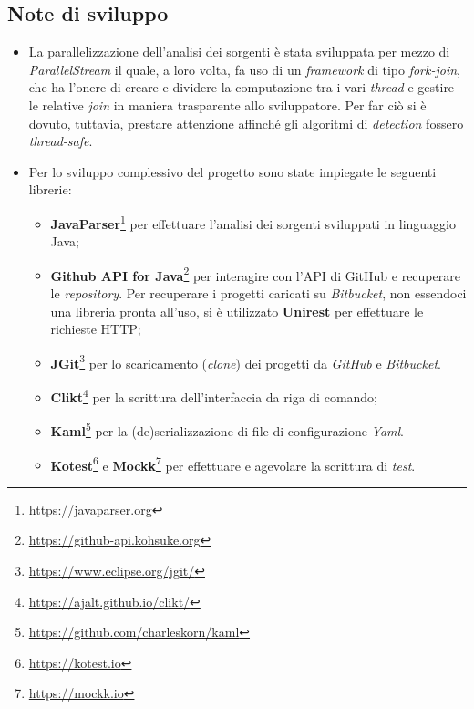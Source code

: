 \subsection*{Note di sviluppo}
\begin{itemize}
	\item La parallelizzazione dell'analisi dei sorgenti è stata sviluppata per mezzo di \textit{ParallelStream} il quale, a loro volta, fa uso di un \textit{framework} di tipo \textit{fork-join}, che ha l'onere di creare e dividere la computazione tra i vari \textit{thread} e gestire le relative \textit{join} in maniera trasparente allo sviluppatore. Per far ciò si è dovuto, tuttavia, prestare attenzione affinché gli algoritmi di \textit{detection} fossero \textit{thread-safe}.
	\item Per lo sviluppo complessivo del progetto sono state impiegate le seguenti librerie:
	\begin{itemize}
		\item \textbf{JavaParser}\footnote{\url{https://javaparser.org}} per effettuare l'analisi dei sorgenti sviluppati in linguaggio Java;
		\item \textbf{Github API for Java}\footnote{\url{https://github-api.kohsuke.org}} per interagire con l'API di GitHub e recuperare le \textit{repository}. Per recuperare i progetti caricati su \textit{Bitbucket}, non essendoci una libreria pronta all'uso, si è utilizzato \textbf{Unirest} per effettuare le richieste HTTP;
		\item \textbf{JGit}\footnote{\url{https://www.eclipse.org/jgit/}} per lo scaricamento (\textit{clone}) dei progetti da \textit{GitHub} e \textit{Bitbucket}.
		\item \textbf{Clikt}\footnote{\url{https://ajalt.github.io/clikt/}} per la scrittura dell'interfaccia da riga di comando;
		\item \textbf{Kaml}\footnote{\url{https://github.com/charleskorn/kaml}} per la (de)serializzazione di file di configurazione \textit{Yaml}.
		\item \textbf{Kotest}\footnote{\url{https://kotest.io}} e \textbf{Mockk}\footnote{\url{https://mockk.io}} per effettuare e agevolare la scrittura di \textit{test}.
	\end{itemize}
\end{itemize}
